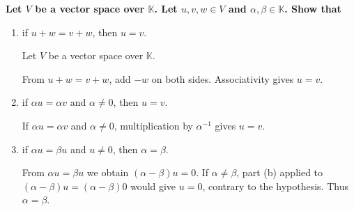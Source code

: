 \providecommand{\rank}{\operatorname{r}}
\providecommand{\RR}{\mathbb R}
\providecommand{\CC}{\mathbb C}
\providecommand{\KK}{\mathbb K}

\setcounter{enumi}{59}
\item {\bfseries\boldmath
Let $V$ be a vector space over $\KK$. Let $u,v,w\in V$ and $\alpha,\beta\in\KK$. Show that
}

\begin{enumerate}[label=\alph*)]

\item if $u+w=v+w$, then $u=v$.

\begin{answer}
Let $V$ be a vector space over $\KK$.

From $u+w=v+w$, add $-w$ on both sides. Associativity gives $u=v$.
\end{answer}

\item if $\alpha u=\alpha v$ and $\alpha\ne0$, then $u=v$.

\begin{answer}
If $\alpha u=\alpha v$ and $\alpha\ne0$, multiplication by $\alpha^{-1}$
gives $u=v$.
\end{answer}

\item if $\alpha u=\beta u$ and $u\ne0$, then $\alpha=\beta$.

\begin{answer}
From $\alpha u=\beta u$ we obtain $(\alpha-\beta)u=0$.
If $\alpha\ne\beta$, part (b) applied to $(\alpha-\beta)u=(\alpha-\beta)0$
would give $u=0$, contrary to the hypothesis. Thus $\alpha=\beta$.
\end{answer}
\end{enumerate}
